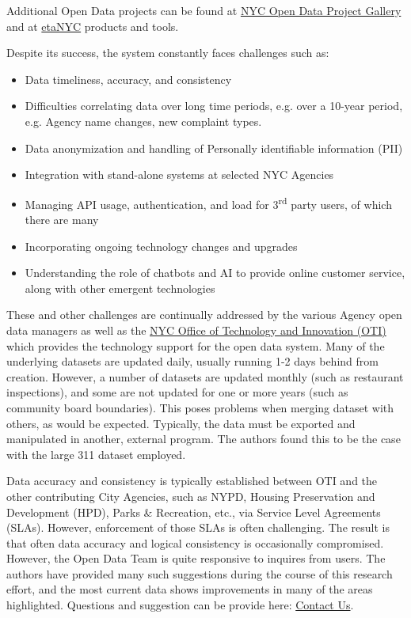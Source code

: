 \documentclass[12pt, titlepage]{article}
\begin{document}
Additional Open Data projects can be found at \href{https://opendata.cityofnewyork.us/projects/}{NYC Open Data Project Gallery}
and at \href{https://beta.nyc/beta/products/}{\textbeta etaNYC} products and tools.

Despite its success, the system constantly faces challenges such as:

\begin{itemize}
	\item Data timeliness, accuracy, and consistency
	\item Difficulties correlating data over long time periods, e.g. over a 10-year period, e.g. Agency name changes, new complaint types.
	\item Data anonymization and handling of Personally identifiable information (PII)
	\item Integration with stand-alone systems at selected NYC Agencies
	\item Managing API usage, authentication, and load for 3\textsuperscript{rd} party users, of which there are many
	\item Incorporating ongoing technology changes and upgrades 
	\item Understanding the role of chatbots and AI to provide online customer service, along with other emergent technologies
\end{itemize}

These and other challenges are continually addressed by the various Agency open data managers
as well as the \href{https://www.nyc.gov/content/oti/pages/}{NYC Office of Technology and Innovation (OTI)} which
provides the technology support for the open data system.  
Many of the underlying datasets are updated daily, usually running 1-2 days behind from creation.
However, a number of datasets are updated monthly (such as restaurant inspections), and some are
not updated for one or more years (such as community board boundaries). This poses problems when 
merging dataset with others, as would be expected. Typically, the data must be
exported and manipulated in another, external program. The authors found this to be the case with 
the large 311 dataset employed.

Data accuracy and consistency is typically established between OTI and the other contributing
City Agencies, such as NYPD, Housing Preservation and Development (HPD), Parks \& Recreation, etc.,
via Service Level Agreements (SLAs). However, enforcement of those SLAs is often challenging. The 
result is that often data accuracy and logical consistency is occasionally compromised. However, the Open Data
Team is quite responsive to inquires from users. The authors have provided many such 
suggestions during the course of this research effort, and the most current data shows improvements
in many of the areas highlighted. Questions and suggestion  can be provide here: 
\href{https://opendata.cityofnewyork.us/engage/}{Contact Us}.
\end{document}
